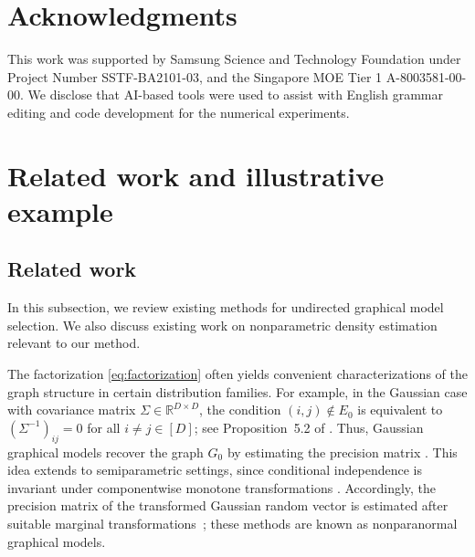 \documentclass[11pt,a4paper,final]{article}
\numberwithin{equation}{section}
\theoremstyle{remark}
\newcommand{\bbR}{{\mathbb R}}
\begin{document}
\section*{Acknowledgments}
This work was supported by Samsung Science and Technology Foundation under Project Number SSTF-BA2101-03, and the Singapore MOE Tier 1 A-8003581-00-00.
We disclose that AI-based tools were used to assist with English grammar editing and code development for the numerical experiments.

\clearpage
\pagebreak

% 



\clearpage
\pagebreak
\appendix
\renewcommand{\contentsname}{Appendix}

\renewcommand{\thesection}{\Alph{section}}
\tableofcontents

\setcounter{figure}{0}
\renewcommand{\thefigure}{A\arabic{figure}}

\setcounter{table}{0}
\renewcommand{\thetable}{A\arabic{table}}

\section{Related work and illustrative example}
\label{sec:supp_rel}

\subsection{Related work} \label{ssec:supp_related}

In this subsection, we review existing methods for undirected graphical model selection.
We also discuss existing work on nonparametric density estimation relevant to our method.

The factorization \eqref{eq:factorization} often yields convenient characterizations of the graph structure in certain distribution families.
For example, in the Gaussian case with covariance matrix $\Sigma \in \bbR^{D \times D}$, the condition $(i,j) \notin E_{0}$ is equivalent to $(\Sigma^{-1})_{ij} = 0$ for all $i \neq j \in [D]$; see Proposition~5.2 of \cite{lauritzen1996graphical}.
Thus, Gaussian graphical models recover the graph $G_{0}$ by estimating the precision matrix \citep{dempster1972covariance, meinshausen2006high, yuan2007model, friedman2008sparse}.
This idea extends to semiparametric settings, since conditional independence is invariant under componentwise monotone transformations \citep{liu2009nonparanormal}.
Accordingly, the precision matrix of the transformed Gaussian random vector is estimated after suitable marginal transformations~\citep{liu2009nonparanormal, liu2012copula, xue2012regularized}; these methods are known as nonparanormal graphical models.
\end{document}
